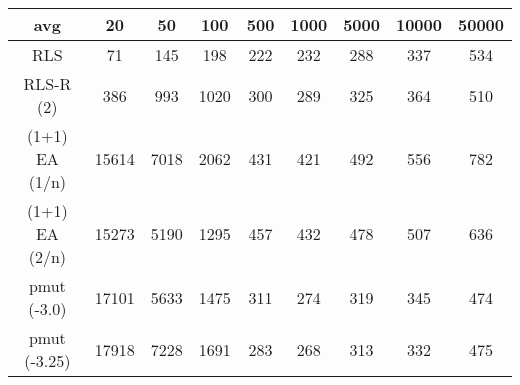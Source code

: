 \begin{tabular}[h]{ccccccccc}
avg&20&50&100&500&1000&5000&10000&50000\\\hline
RLS&71&145&198&222&232&288&337&534\\
RLS-R (2)&386&993&1020&300&289&325&364&510\\
(1+1) EA (1/n)&15614&7018&2062&431&421&492&556&782\\
(1+1) EA (2/n)&15273&5190&1295&457&432&478&507&636\\
pmut (-3.0)&17101&5633&1475&311&274&319&345&474\\
pmut (-3.25)&17918&7228&1691&283&268&313&332&475\\
\end{tabular}
